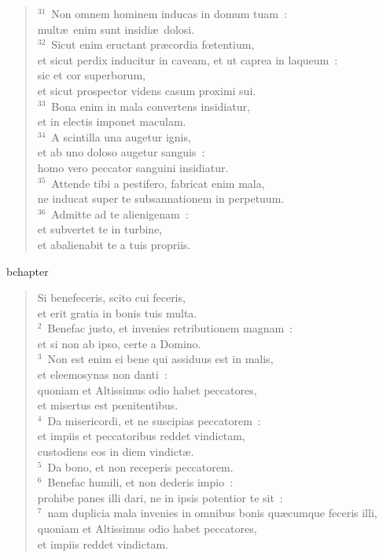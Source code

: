 \begin{verse}${}^{31}$~Non omnem hominem inducas in domum tuam~:\\ mult\ae\ enim sunt insidi\ae\ dolosi.\\
${}^{32}$~Sicut enim eructant pr\ae cordia fœtentium,\\ et sicut perdix inducitur in caveam, et ut caprea in laqueum~:\\ sic et cor superborum,\\ et sicut prospector videns casum proximi sui.\\
${}^{33}$~Bona enim in mala convertens insidiatur,\\ et in electis imponet maculam.\\
${}^{34}$~A scintilla una augetur ignis,\\ et ab uno doloso augetur sanguis~:\\ homo vero peccator sanguini insidiatur.\\
${}^{35}$~Attende tibi a pestifero, fabricat enim mala,\\ ne inducat super te subsannationem in perpetuum.\\
${}^{36}$~Admitte ad te alienigenam~:\\ et subvertet te in turbine,\\ et abalienabit te a tuis propriis.\end{verse}


bchapter\begin{verse}\vspace{-19pt}Si benefeceris, scito cui feceris,\\ et erit gratia in bonis tuis multa.\\
${}^{2}$~Benefac justo, et invenies retributionem magnam~:\\ et si non ab ipso, certe a Domino.\\
${}^{3}$~Non est enim ei bene qui assiduus est in malis,\\ et eleemosynas non danti~:\\ quoniam et Altissimus odio habet peccatores,\\ et misertus est pœnitentibus.\\
${}^{4}$~Da misericordi, et ne suscipias peccatorem~:\\ et impiis et peccatoribus reddet vindictam,\\ custodiens eos in diem vindict\ae .\\
${}^{5}$~Da bono, et non receperis peccatorem.\\
${}^{6}$~Benefac humili, et non dederis impio~:\\ prohibe panes illi dari, ne in ipsis potentior te sit~:\\
${}^{7}$~nam duplicia mala invenies in omnibus bonis qu\ae cumque feceris illi,\\ quoniam et Altissimus odio habet peccatores,\\ et impiis reddet vindictam.\end{verse}


